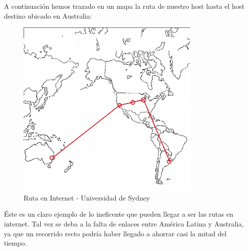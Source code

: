 A continuación hemos trazado en un mapa la ruta de nuestro host hasta el host destino ubicado en Australia:
\begin{figure}[H]
\centering
\includegraphics[width=0.8\textwidth]{graficos/mapa_australia.jpg}
\caption{Ruta en Internet - Universidad de Sydney}
\label{australia_zs}
\end{figure}

Éste es un claro ejemplo de lo ineficente que pueden llegar a ser las rutas en internet. Tal vez se deba a la falta de enlaces entre América Latina y Australia, ya que un recorrido recto podría haber llegado a ahorrar casi la mitad del tiempo.